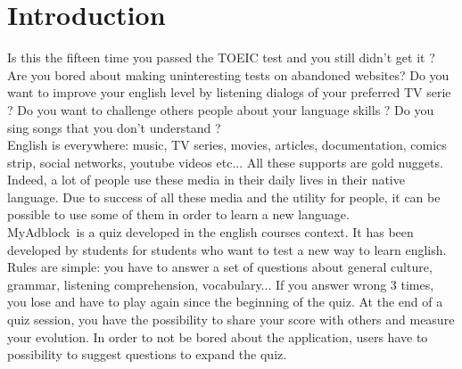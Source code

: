\documentclass[a4paper,11pt, oneside]{book}
\author{Yann Prono, Quentin Tardivon}
\date{\today}
\def\appName{MyAdblock}
\begin{document}
	\begin{titlepage}
		
	\end{titlepage}


	\newpage\newpage\null\thispagestyle{empty}
	\newpage
		\tableofcontents
		\thispagestyle{empty}


	\chapter{Introduction}

	\setcounter{page}{1}

Is this the fifteen time you passed the TOEIC test and you still didn't get it ?
Are you bored about making uninteresting tests on abandoned websites?
Do you want to improve your english level by listening dialogs of your preferred TV serie ?
Do you want to challenge others people about your language skills ?
Do you sing songs that you don't understand ?\\

\noindent English is everywhere: music, TV series, movies, articles, documentation, comics strip, social networks, youtube videos etc...
All these supports are gold nuggets. Indeed, a lot of people use these media in their daily lives in their native language.
Due to success of all these media and the utility for people, it can be possible to use some of them in order to learn a new language.\\

\noindent \appName \ is a quiz developed in the english courses context. It has been developed by students for students who want to test a new way to learn english.
Rules are simple: you have to answer a set of questions about general culture, grammar, listening comprehension, vocabulary... If you answer wrong 3 times, you lose and have to play again since the beginning of the quiz.
At the end of a quiz session, you have the possibility to share your score with others and measure your evolution.
In order to not be bored about the application, users have to possibility to suggest questions to expand the quiz.
\end{document}
